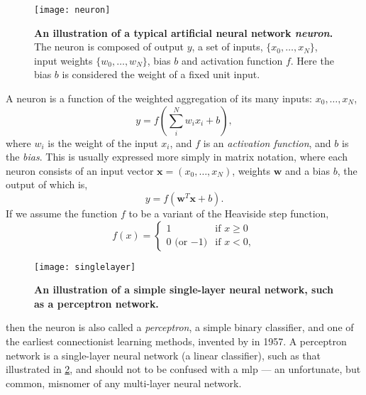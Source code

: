 \documentclass[thesis]{subfiles}
\begin{document}
\begin{figure}[tbp]
\centering
\texttt{[image: neuron]}
\caption[An illustration of a typical artificial neural network neuron]{\textbf{An illustration of a typical artificial neural network \emph{neuron}.} The neuron is composed of output $y$, a set of inputs, $\{x_0, \ldots, x_N\}$, input weights $\{w_0, \ldots, w_N\}$, bias $b$ and activation function $f$. Here the bias $b$ is considered the weight of a fixed unit input.}
\label{fig:neuron}
\end{figure}
A neuron is a function of the weighted aggregation of its many inputs: ${x_0,\ldots,x_N}$,
%
\begin{equation}
	y = f\left(\sum_{i}^{N} w_i x_i + b\right),
\end{equation}
%
where $w_i$ is the weight of the input $x_i$, and $f$ is an \emph{activation function}, and $b$ is the \emph{bias}. This is usually expressed more simply in matrix notation, where each neuron consists of an input vector $\mathbf{x}=(x_0,\ldots,x_N)$, weights $\mathbf{w}$ and a bias $b$, the output of which is, %
%
\begin{equation}
    y = f\left(\mathbf{w}^T\mathbf{x} + b \right).
\end{equation}
%
If we assume the function $f$ to be a variant of the Heaviside step function,
\begin{equation}
    f(x) = 
\begin{cases}
1 & \text{if } x \geq 0\\
0 \textrm{ (or $-1$)} & \text{if } x < 0,
\end{cases}
\end{equation}
%
\begin{figure}[tbp]
\centering
\texttt{[image: singlelayer]}
\caption[A single-layer neural network]{\textbf{An illustration of a simple single-layer neural network, such as a perceptron network.}}
\label{fig:singlelayer}
\end{figure}
then the neuron is also called a \emph{perceptron}, a simple binary classifier, and one of the earliest connectionist learning methods, invented by \citet{rosenblatt1958perceptron} in 1957. A perceptron network is a single-layer neural network (\ie{}a linear classifier), such as that illustrated in \cref{fig:singlelayer}, and should not to be confused with a \gls{mlp} --- an unfortunate, but common, misnomer of any multi-layer neural network.
\end{document}

